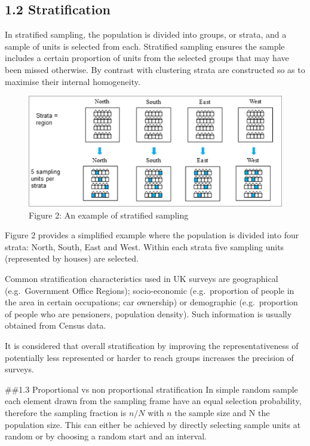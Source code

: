 \documentclass[
  14,
  a4paper,
  DIV=11,
  numbers=noendperiod]{scrartcl}
\begin{document}
\hypertarget{stratification}{%
\subsection{1.2 Stratification}\label{stratification}}

In stratified sampling, the population is divided into groups, or
strata, and a sample of units is selected from each. Stratified sampling
ensures the sample includes a certain proportion of units from the
selected groups that may have been missed otherwise. By contrast with
clustering strata are constructed so as to maximise their internal
homogeneity.

\begin{figure}

{\centering \includegraphics{pics/strata.png}

}

\caption{Figure 2: An example of stratified sampling}

\end{figure}

Figure 2 provides a simplified example where the population is divided
into four strata: North, South, East and West. Within each strata five
sampling units (represented by houses) are selected.

Common stratification characteristics used in UK surveys are
geographical (e.g.~Government Office Regions); socio-economic
(e.g.~proportion of people in the area in certain occupations; car
ownership) or demographic (e.g.~proportion of people who are pensioners,
population density). Such information is usually obtained from Census
data.

It is considered that overall stratification by improving the
representativeness of potentially less represented or harder to reach
groups increases the precision of surveys.

\#\#1.3 Proportional vs non proportional stratification In simple random
sample each element drawn from the sampling frame have an equal
selection probability, therefore the sampling fraction is \(n/N\) with
\(n\) the sample size and N the population size. This can either be
achieved by directly selecting sample units at random or by choosing a
random start and an interval.
\end{document}
